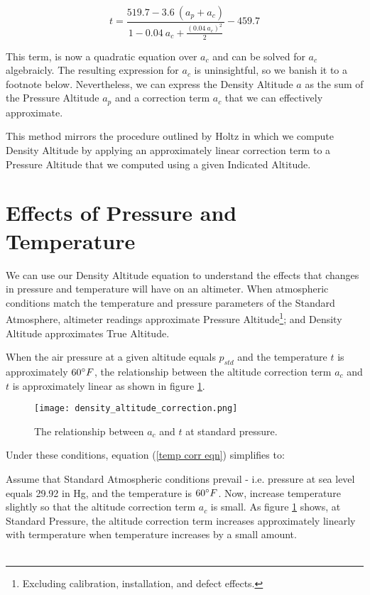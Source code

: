 \documentclass[10pt,a4paper]{article}
\begin{document}
\begin{equation}
\label{temp corr eqn}
t = \frac{519.7 - 3.6\ (a_{p} + a_{c})}{1 - 0.04\ a_{c} + \frac{(0.04\ a_{c})^2}{2}} - 459.7
\end{equation}

This term, is now a quadratic equation over $a_{c}$ and can be solved for $a_{c}$ algebraicly. The resulting expression for $a_c$ is uninsightful, so we banish it to a footnote below. Nevertheless, we can express the Density Altitude $a$ as the sum of the Pressure Altitude $a_{p}$ and a correction term $a_{c}$ that we can effectively approximate.

This method mirrors the procedure outlined by Holtz in which we compute Density Altitude by applying an approximately linear correction term to a Pressure Altitude that we computed using a given Indicated Altitude.

\section{Effects of Pressure and Temperature}

We can use our Density Altitude equation to understand the effects that changes in pressure and temperature will have on an altimeter. When atmospheric conditions match the temperature and pressure parameters of the Standard Atmosphere, altimeter readings approximate Pressure Altitude\footnote{Excluding calibration, installation, and defect effects.}; and Density Altitude approximates True Altitude.

When the air pressure at a given altitude equals $p_{std}$ and the temperature $t$ is approximately $60\degree F$, the relationship between the altitude correction term $a_c$ and $t$ is approximately linear as shown in figure \ref{plot alt corr temp}.

\begin{figure}[H]
\texttt{[image: density\_altitude\_correction.png]}
\caption{The relationship between $a_c$ and $t$ at standard pressure.}
\label{plot alt corr temp}
\end{figure}

Under these conditions, equation (\ref{temp corr eqn}) simplifies to:



Assume that Standard Atmospheric conditions prevail - i.e. pressure at sea level equals 29.92 in Hg, and the temperature is $60\degree F$. Now, increase temperature slightly so that the altitude correction term $a_c$ is small. As figure \ref{plot alt corr temp} shows, at Standard Pressure, the altitude correction term increases approximately linearly with termperature when temperature increases by a small amount.


\begin{align}
\end{align}
\end{document}
